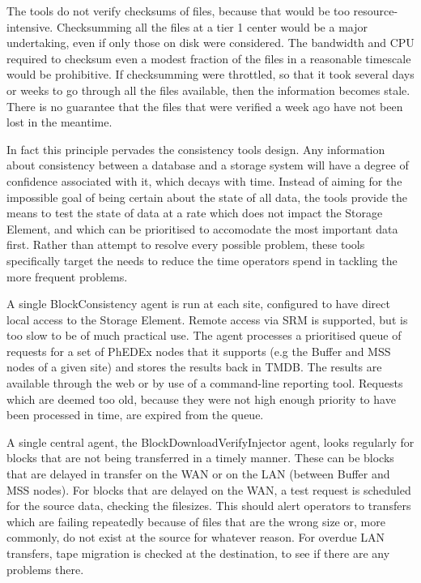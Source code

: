 \documentclass{PoS}
\begin{document}
The tools do not verify checksums of files, because that would be too
resource-intensive. Checksumming all the files at a tier 1 center would be a
major undertaking, even if only those on disk were considered. The
bandwidth and CPU required to checksum even a modest fraction of the
files in a reasonable timescale would be prohibitive. If checksumming
were throttled, so that it took several days or weeks to go through
all the files available, then the information becomes stale. There is
no guarantee that the files that were verified a week ago have not
been lost in the meantime.

In fact this principle pervades the consistency tools design. Any
information about consistency between a database and a storage system
will have a degree of confidence associated with it, which decays with
time. Instead of aiming for the impossible goal of being certain about
the state of all data, the tools provide the means to test the state
of data at a rate which does not impact the Storage Element, and which
can be prioritised to accomodate the most important data first. Rather
than attempt to resolve every possible problem, these tools
specifically target the needs to reduce the time operators spend in
tackling the more frequent problems.

A single BlockConsistency agent is run at each site, configured to
have direct local access to the Storage Element. Remote access via SRM
is supported, but is too slow to be of much practical use. The agent
processes a prioritised queue of requests for a set of PhEDEx nodes
that it supports (e.g the Buffer and MSS nodes of a given site) and
stores the results back in TMDB. The results are available through the
web or by use of a command-line reporting tool. Requests which are
deemed too old, because they were not high enough priority to have
been processed in time, are expired from the queue.

A single central agent, the BlockDownloadVerifyInjector agent, looks
regularly for blocks that are not being transferred in a timely
manner. These can be blocks that are delayed in transfer on the WAN or
on the LAN (between Buffer and MSS nodes). For blocks that are delayed
on the WAN, a test request is scheduled for the source data, checking
the filesizes. This should alert operators to transfers which are
failing repeatedly because of files that are the wrong size or, more
commonly, do not exist at the source for whatever reason. For overdue
LAN transfers, tape migration is checked at the destination, to see if
there are any problems there.
\end{document}
